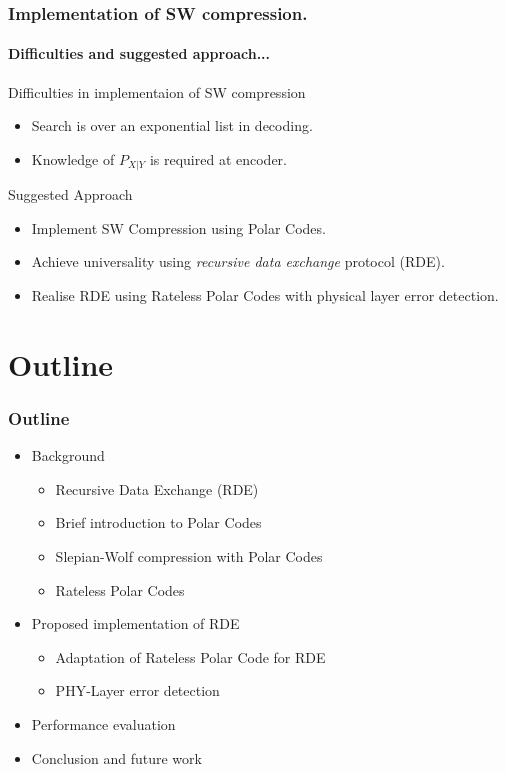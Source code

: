\documentclass[xcolor=dvipsnames]{beamer}
\begin{document}
\begin{frame}
\frametitle{Implementation of SW compression.}
\framesubtitle{ Difficulties and suggested approach...}
Difficulties in implementaion of SW compression
\begin{itemize}
\item Search is over an exponential list in decoding.
\item Knowledge of $P_{X|Y}$ is required at encoder.
\end{itemize}
\begin{block}{Suggested Approach}
\begin{itemize}
\item{Implement SW Compression using Polar Codes.}
\item{Achieve universality using \emph{recursive data exchange} protocol (RDE).}
\item{Realise RDE using Rateless Polar Codes with physical layer error detection.}
\end{itemize}
\end{block}
\end{frame}

\section{Outline}
\begin{frame}
\frametitle{Outline}
\begin{itemize}
\item Background
\begin{itemize}
\item{Recursive Data Exchange (RDE)}
\item{Brief introduction to Polar Codes}
\item{Slepian-Wolf compression with Polar Codes}
\item{Rateless Polar Codes}
\end{itemize}
\item Proposed implementation of RDE
\begin{itemize}
\item Adaptation of Rateless Polar Code for RDE
\item PHY-Layer error detection
\end{itemize}
\item Performance evaluation
\item Conclusion and future work
\end{itemize}
\end{frame}
\end{document}
